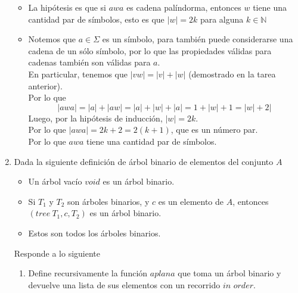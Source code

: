 \documentclass{article}
\begin{document}
\begin{enumerate}
{\begin{enumerate}
{\begin{itemize}
{                            Entonces $|w| = 0 = 2\cdot 0$.\\
                            Por lo que $w = \epsilon$ tiene una cantidad par de 
                            símbolos.
                        }
                        \item {
                            La hipótesis es que si $awa$ es cadena palíndorma, 
                            entonces $w$ tiene una cantidad par de símbolos, 
                            esto es que $|w| = 2k$ para alguna $k \in \mathbb{N}$
                        }
                        \item {
                            Notemos que $a \in \Sigma$ es un símbolo, para 
                            también puede considerarse una cadena de un sólo 
                            símbolo, por lo que las propiedades válidas para 
                            cadenas también son válidas para $a$.\\
                            En particular, tenemos que $|vw| = |v| + |w|$ 
                            (demostrado en la tarea anterior).\\
                            Por lo que
                            \[|awa| = |a| + |aw| = |a| + |w| + |a| = 1 + |w| + 1
                            = |w| + 2|\]
                            Luego, por la hipótesis de inducción, $|w| = 2k$.\\
                            Por lo que $|awa| = 2k + 2 = 2 (k+1)$, que es un 
                            número par.\\
                            Por lo que $awa$ tiene una cantidad par de símbolos.                        }
                    \end{itemize}
                }
                
            \end{enumerate}
        }
        \item {
            Dada la siguiente definición de árbol binario de elementos del 
            conjunto $A$
            \begin{itemize}
                \item {
                    Un árbol vacío $void$ es un árbol binario.
                }
                \item {
                    Si $T_1$ y $T_2$ son árboles binarios, y $c$ es un elemento 
                    de $A$, entonces $(tree \ T_1, c, T_2)$ es un árbol binario.
                }
                \item {
                    Estos son todos los árboles binarios.
                }
            \end{itemize}
            Responde a lo siguiente
            \begin{enumerate}
                \item {
                    Define recursivamente la función $aplana$ que toma
                    un árbol binario y devuelve una lista de sus elementos con 
                    un recorrido $\textit{in order}$.\\
		            
}
\end{enumerate}}
\end{enumerate}
\end{document}
